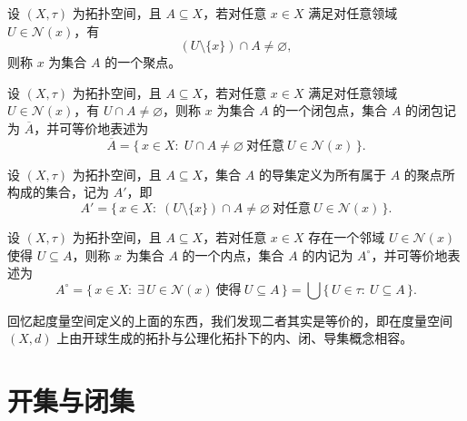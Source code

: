 \documentclass[lang=cn,a4paper,newtx,figureplace=section,tableplace=section]{elegantbook}
\begin{document}
\begin{definition}[聚点]\label{def:accumulation_point} 设 $(X,\tau)$ 为拓扑空间，且 $A\subseteq X$，若对任意 $x\in X$ 满足对任意领域 $U\in\mathcal{N}(x)$，有 \begin{equation} (U\setminus\{x\})\cap A\neq\varnothing, \end{equation} 则称 $x$ 为集合 $A$ 的一个聚点。 
\end{definition}

\begin{definition}[闭包点]\label{def:closure_point} 设 $(X,\tau)$ 为拓扑空间，且 $A\subseteq X$，若对任意 $x\in X$ 满足对任意领域 $U\in\mathcal{N}(x)$，有 $U\cap A\neq\varnothing$，则称 $x$ 为集合 $A$ 的一个闭包点，集合 $A$ 的闭包记为 $\overline{A}$，并可等价地表述为 \begin{equation} \overline{A}=\{\,x\in X:\; U\cap A\neq\varnothing\ \text{对任意}\ U\in\mathcal{N}(x)\,\}. \end{equation}
\end{definition}

\begin{definition}[导集]\label{def:derived} 设 $(X,\tau)$ 为拓扑空间，且 $A\subseteq X$，集合 $A$ 的导集定义为所有属于 $A$ 的聚点所构成的集合，记为 $A'$，即 \begin{equation} A'=\{\,x\in X:\; (U\setminus\{x\})\cap A\neq\varnothing\ \text{对任意}\ U\in\mathcal{N}(x)\,\}. \end{equation} \end{definition}

\begin{definition}[内点]\label{def:interior_point} 设 $(X,\tau)$ 为拓扑空间，且 $A\subseteq X$，若对任意 $x\in X$ 存在一个邻域 $U\in\mathcal{N}(x)$ 使得 $U\subseteq A$，则称 $x$ 为集合 $A$ 的一个内点，集合 $A$ 的内记为 $A^\circ$，并可等价地表述为 \begin{equation} A^\circ=\{\,x\in X:\;\exists\,U\in\mathcal{N}(x)\ \text{使得}\ U\subseteq A\,\}=\bigcup\{\,U\in\tau:\ U\subseteq A\,\}. \end{equation} \end{definition}

\begin{remark}
回忆起度量空间定义的上面的东西，我们发现二者其实是等价的，即在度量空间 $(X,d)$ 上由开球生成的拓扑与公理化拓扑下的内、闭、导集概念相容。
\end{remark}

\section{开集与闭集}
\end{document}
